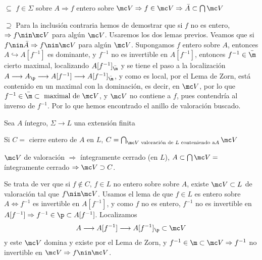 \begin{dem}
    $\boxed{\subseteq} $ $f\in \Sigma$ sobre $A \Rightarrow f$ entero sobre $\mc V \Rightarrow f\in \mc V \Rightarrow \bar A \subset \bigcap \mc V$

    $\boxed{\supseteq}$ Para la inclusi\'on contraria hemos de demostrar que si $f$ no es entero, $\Rightarrow f\nin \mc V$ para alg\'un $\mc V$. Usaremos los dos lemas previos. Veamos que si $f\nin \bar A\Rightarrow f\nin \mc V$ para alg\'un $\mc V$. Supongamos $f$ entero sobre $A$, entonces $A \hookrightarrow A[f^{-1}]$ es dominante, y $f^{-1}$ no es invertible en $A[f^{-1}]$, entonces $f^{-1} \in \bar \m$ cierto maximal, localizando $A[f^{-1}]_{\bar \m}$ y se tiene el paso a la localizaci\'on $A \longrightarrow A_\p \longrightarrow A[f^{-1}] \longrightarrow A[f^{-1}]_{\bar \m}$, y como es local, por el Lema de Zorn, est\'a contenido en un maximal con la dominaci\'on, es decir, en $\mc V$, por lo que $f^{-1} \in \bar \m \subset \text{ maximal de } \mc V$, y $\mc V$ no contiene a $f$, pues contendr\'ia al inverso de $f^{-1}$. Por lo que hemos encontrado el anillo de valoraci\'on buscado.  
\end{dem}
Sea $A$ \'integro, $\Sigma \longrightarrow L$ una extensi\'on finita
\begin{teo}
    Si $C = $ cierre entero de $A$ en $L$, $C = \bigcap_{\mc V \text{ valoraci\'on de } L \text{ conteniendo a} A} \mc V$
\end{teo}
\begin{dem}
    $\mc V$ de valoraci\'on $\Rightarrow$ \'integramente cerrado (en $L$), $A \subset \bigcap \mc V = $\'integramente cerrado $\Rightarrow \mc V \supset C$.

    Se trata de ver que si $f\nin C, \, f\in L$ no entero sobre sobre $A$, existe $\mc V \subset L$ de valoraci\'on tal que $f\nin \mc V$. Usamos el lema de que $f\in L$ es entero sobre $A \iff f^{-1}$ es invertible en $A[f^{-1}]$, y como $f$ no es entero, $f^{-1}$ no es invertible en $A[f^{-1}] \Rightarrow f^{-1} \in \p \subset A[f^{-1}]$. Localizamos
    $$A \longrightarrow A[f^{-1}] \longrightarrow A[f^{-1}]_{\p} \subset \mc V$$
    y este $\mc V$ domina y existe por el Lema de Zorn, y $f^{-1} \in \m \subset \mc V \Rightarrow f^{-1}$ no invertible en $\mc V\Rightarrow f\nin \mc V$. 
\end{dem}

